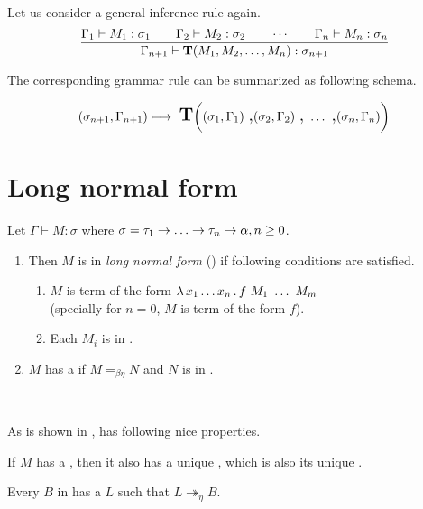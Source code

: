 \documentclass[12pt,a4paper]{report}
\newcommand{\Lets}{Let us\xspace}
\newcommand{\tur}[3]{#1\vdash{}#2:#3}
\newcommand{\turst}[3]{$#1\vdash{}#2:#3$\xspace}
\newcommand{\GMS}{\turst{\Gamma}{M}{\sigma}}
\begin{document}
\Lets consider a general inference rule again.
$$ 
\ruleIV
  { \tur{\Gamma_1}{M_1}{\sigma_1} }
  { \tur{\Gamma_2}{M_2}{\sigma_2} }
  { \dotsm }
  { \tur{\Gamma_n}{M_n}{\sigma_n} }
  { \tur{\Gamma_{n+1}}{ \mathbf{T}(M_1,M_2,\dots,M_n)}{\sigma_{n+1}} } 
$$

The corresponding grammar rule can be summarized as following schema.

$$
 (\sigma_{n+1},\Gamma_{n+1})
 \longmapsto
 \mbox{ {\Large \textbf{T}}} 
 \bigg( 
 (\sigma_1,\Gamma_1)
 \mbox{ {\Large ,}}
 (\sigma_2,\Gamma_2)
 \mbox{ {\Large ,}}
 ~\dots
 \mbox{ {\Large ,}}
 (\sigma_n,\Gamma_n)
 \bigg)  
$$


	


\section{Long normal form}
\label{lnf}


\begin{definition}
Let \GMS where 
$\sigma = \tau_1 \ar \dots \ar \tau_n \ar \alpha, n \geq 0$.
	\begin{enumerate}
	  \item	
		Then $M$ is in \textit{long normal form} (\lnf) if following 
		conditions are satisfied.
		\begin{enumerate}
		 \item $M$ is term of the form $\lambda \, x_1 \dots x_n \, . \, f~M_1~\dots~M_m$\\
		  (specially for $n = 0$, $M$ is term of the form $f$).
		 \item Each $M_i$ is in \lnf.
		\end{enumerate}	
	  \item 
	    $M$ has a \lnf if $M =_{\beta\eta} N$ and $N$ is in \lnf.
	\end{enumerate}
\end{definition}~

As is shown in \cite{barendregt10}, \lnf has following nice properties.

\begin{proposition}
If $M$ has a \bnf, 
then it also has a unique \lnf, 
which is also its unique \beenf.
\end{proposition}

\begin{proposition}
Every $B$ in \bnf has a \lnf 
$L$ such that $L \twoheadrightarrow_{\eta} B$.
\end{proposition}
\end{document}
